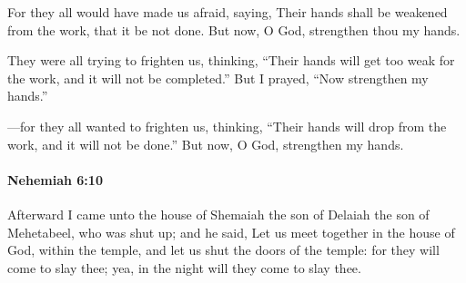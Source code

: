 			\begin{versebox}
					\item[BHS] 
					\item[LXX] 
					\item[ASV] For they all would have made us afraid, saying, Their hands shall be weakened from the work, that it be not done. But now, O God, strengthen thou my hands.
					\item[NIV] They were all trying to frighten us, thinking, “Their hands will get too weak for the work, and it will not be completed.” But I prayed, “Now strengthen my hands.”
					\item[NRSV] —for they all wanted to frighten us, thinking, “Their hands will drop from the work, and it will not be done.” But now, O God, strengthen my hands.
			\end{versebox}

		\paragraph{Nehemiah 6:10} %
			\label{NEHEMIAH-6-10}

			Afterward I came unto the house of Shemaiah the son of Delaiah the son of Mehetabeel, who was shut up; and he said, Let us meet together in the house of God, within the temple, and let us shut the doors of the temple: for they will come to slay thee; yea, in the night will they come to slay thee.

